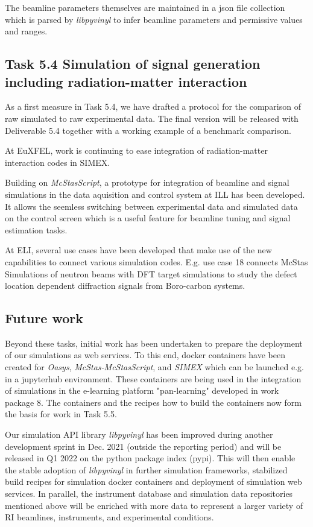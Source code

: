 \documentclass[11pt]{article}
\begin{document}
The beamline parameters themselves are maintained in a json file collection
which is parsed by \emph{libpyvinyl} to infer beamline parameters and permissive
values and ranges.


\subsection{Task 5.4 Simulation of signal generation including radiation-matter interaction}
\label{sec:org64da9da}

As a first measure in Task 5.4, we have drafted a protocol for the comparison of
raw simulated to raw experimental data. The final version will be released with
Deliverable 5.4 together with a working example of a benchmark comparison.

At EuXFEL, work is continuing to ease integration of radiation-matter interaction
codes in SIMEX.

Building on \emph{McStasScript}, a prototype for integration of beamline and signal
simulations in the data aquisition and control system at ILL has been developed.
It allows the seemless switching between experimental data and simulated data on the control screen
which is a useful feature for beamline tuning and signal estimation tasks.

At ELI, several use cases have been developed that make use of the new
capabilities to connect various simulation codes. E.g. use case 18 connects McStas
Simulations of neutron beams with DFT target simulations to study the defect
location dependent diffraction signals from Boro-carbon systems.

\subsection{Future work}
\label{sec:org89500af}
Beyond these tasks, initial work has been undertaken to prepare the deployment
of our simulations as web services. To this end, docker containers have been
created for \emph{Oasys}, \emph{McStas-McStasScript}, and \emph{SIMEX} which can be launched e.g. in
a jupyterhub environment. These containers are being used in the integration of
simulations in the e-learning platform "pan-learning" developed in work
package 8. The containers and the recipes how to build the containers now form the basis
for work in Task 5.5.

Our simulation API library \emph{libpyvinyl} has been improved during another
development sprint in Dec. 2021 (outside the reporting period) and will be
released in Q1 2022 on the python package index (pypi). This will then enable
the stable adoption of \emph{libpyvinyl} in further simulation frameworks, stabilized
build recipes for simulation docker containers and deployment of simulation web
services. In parallel, the instrument database and simulation data repositories
mentioned above will be enriched with more data to represent a larger variety of
RI beamlines, instruments, and experimental conditions.
\end{document}
